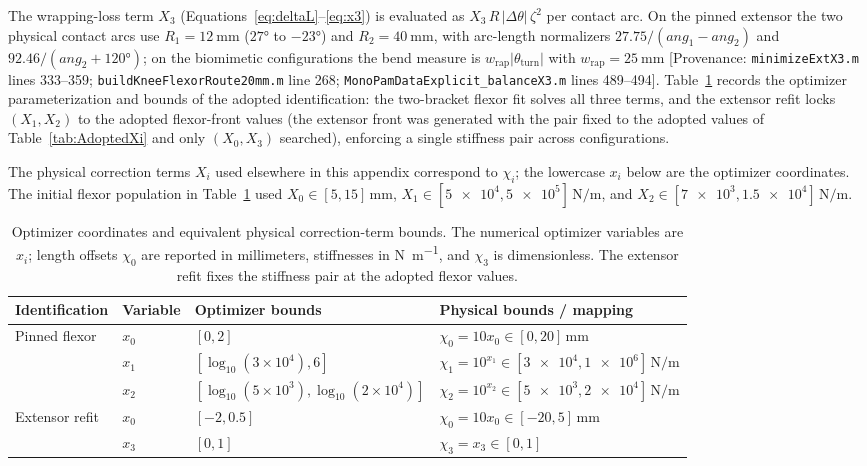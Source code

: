 The wrapping-loss term $X_{3}$ (Equations~\ref{eq:deltaL}--\ref{eq:x3}) is evaluated as $X_{3}\,R\,\lvert\Delta\theta\rvert\,\zeta^{2}$ per contact arc. On the pinned extensor the two physical contact arcs use $R_{1} = \qty{12}{\mm}$ ($\ang{27}$ to $\ang{-23}$) and $R_{2} = \qty{40}{\mm}$, with arc-length normalizers $27.75/(ang_{1} - ang_{2})$ and $92.46/(ang_{2}+\ang{120})$; on the biomimetic configurations the bend measure is $w_{\text{rap}}\lvert\theta_{\text{turn}}\rvert$ with $w_{\text{rap}} = \qty{25}{\mm}$ [Provenance: \nolinkurl{minimizeExtX3.m} lines 333--359; \nolinkurl{buildKneeFlexorRoute20mm.m} line 268; \nolinkurl{MonoPamDataExplicit_balanceX3.m} lines 489--494]. Table~\ref{tab:app_opt_bounds} records the optimizer parameterization and bounds of the adopted identification: the two-bracket flexor fit solves all three terms, and the extensor refit locks $(X_{1}, X_{2})$ to the adopted flexor-front values (the extensor front was generated with the pair fixed to the adopted values of Table~\ref{tab:AdoptedXi} and only $(X_{0}, X_{3})$ searched), enforcing a single stiffness pair across configurations.

The physical correction terms $X_i$ used elsewhere in this appendix correspond to $\chi_i$; the lowercase $x_i$ below are the optimizer coordinates. The initial flexor population in Table~\ref{tab:app_opt_bounds} used $X_0\in[\num{5},\num{15}]\,\unit{\mm}$, $X_1\in[\num{5e4},\num{5e5}]\,\unit{\newton\per\meter}$, and $X_2\in[\num{7e3},\num{1.5e4}]\,\unit{\newton\per\meter}$.

\begin{table}[htbp]
\caption{Optimizer coordinates and equivalent physical correction-term bounds. The numerical optimizer variables are $x_i$; length offsets $\chi_0$ are reported in millimeters, stiffnesses in \unit{\newton\per\meter}, and $\chi_3$ is dimensionless. The extensor refit fixes the stiffness pair at the adopted flexor values.}
\label{tab:app_opt_bounds}
\small
\begin{tabularx}{\textwidth}{@{}l l >{\raggedright\arraybackslash}X >{\raggedright\arraybackslash}X@{}}
\toprule
Identification & Variable & Optimizer bounds & Physical bounds / mapping \\
\midrule
Pinned flexor & $x_0$ & $[0,2]$ & $\chi_0=10x_0\in[\num{0},\num{20}]\,\unit{\mm}$ \\
 & $x_1$ & $[\log_{10}(3\times10^4),6]$ & $\chi_1=10^{x_1}\in[\num{3e4},\num{1e6}]\,\unit{\newton\per\meter}$ \\
 & $x_2$ & $[\log_{10}(5\times10^3),\log_{10}(2\times10^4)]$ & $\chi_2=10^{x_2}\in[\num{5e3},\num{2e4}]\,\unit{\newton\per\meter}$ \\
Extensor refit & $x_0$ & $[-2,0.5]$ & $\chi_0=10x_0\in[\num{-20},\num{5}]\,\unit{\mm}$ \\
 & $x_3$ & $[0,1]$ & $\chi_3=x_3\in[0,1]$ \\
\bottomrule
\end{tabularx}
\end{table}

